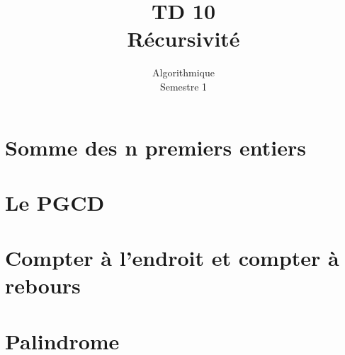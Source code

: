 \documentclass{article}
\title{TD 10\\ Récursivité}
\date{Algorithmique\\ Semestre 1}
\begin{document}
	\maketitle
	\tableofcontents
	\section{Somme des n premiers entiers}
			
	\section{Le PGCD}		
		\subsection{}
			
		\subsection{}
			
		\subsection{}
			
	\section{Compter à l'endroit et compter à rebours}
		\subsection{}
			
		\subsection{}
			
	\section{Palindrome}	
		\subsection{}
		\subsection{}
			
		\subsection{}
			
\end{document}
